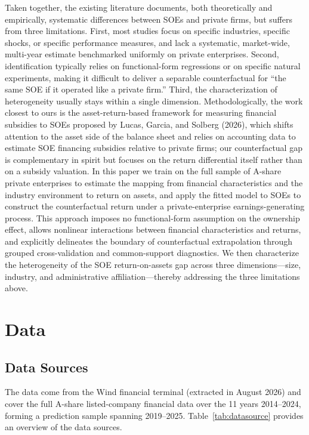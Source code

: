 \documentclass[11pt,a4paper]{article}
\begin{document}
Taken together, the existing literature documents, both theoretically and empirically, systematic differences between SOEs and private firms, but suffers from three limitations. First, most studies focus on specific industries, specific shocks, or specific performance measures, and lack a systematic, market-wide, multi-year estimate benchmarked uniformly on private enterprises. Second, identification typically relies on functional-form regressions or on specific natural experiments, making it difficult to deliver a separable counterfactual for ``the same SOE if it operated like a private firm.'' Third, the characterization of heterogeneity usually stays within a single dimension. Methodologically, the work closest to ours is the asset-return-based framework for measuring financial subsidies to SOEs proposed by Lucas, Garcia, and Solberg (2026), which shifts attention to the asset side of the balance sheet and relies on accounting data to estimate SOE financing subsidies relative to private firms; our counterfactual gap is complementary in spirit but focuses on the return differential itself rather than on a subsidy valuation. In this paper we train on the full sample of A-share private enterprises to estimate the mapping from financial characteristics and the industry environment to return on assets, and apply the fitted model to SOEs to construct the counterfactual return under a private-enterprise earnings-generating process. This approach imposes no functional-form assumption on the ownership effect, allows nonlinear interactions between financial characteristics and returns, and explicitly delineates the boundary of counterfactual extrapolation through grouped cross-validation and common-support diagnostics. We then characterize the heterogeneity of the SOE return-on-assets gap across three dimensions---size, industry, and administrative affiliation---thereby addressing the three limitations above.

\section{Data}

\subsection{Data Sources}

The data come from the Wind financial terminal (extracted in August 2026) and cover the full A-share listed-company financial data over the 11 years 2014--2024, forming a prediction sample spanning 2019--2025. Table~\ref{tab:datasource} provides an overview of the data sources.
\end{document}
